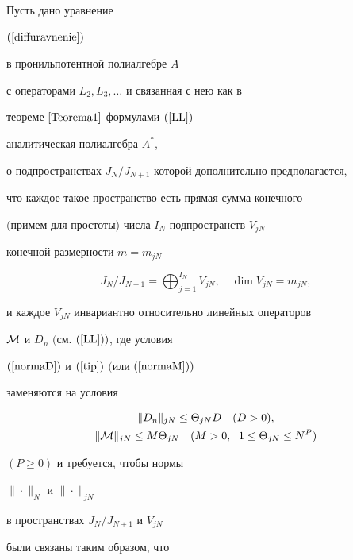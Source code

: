 \begin{thm}


\label{Teoremaegregium}


Пусть дано уравнение


$(\ref{diffuravnenie})$


в пронильпотентной полиалгебре $A$


с операторами $L_2, L_3, \dotsc$ и связанная с нею как в


теореме $\ref{Teorema1}$ формулами $(\ref{LL})$


аналитическая полиалгебра $A^*$,


о подпространствах $J_N/J_{N+1}$ которой дополнительно предполагается,


что каждое такое пространство есть прямая сумма конечного


$($примем для простоты$)$ числа $I_N$ подпространств $V_{jN}$


конечной размерности $m=m_{jN}$


$$




J_N/J_{N+1}=\bigoplus\nolimits_{j=1}^{I_N} V_{jN},\quad \dim V_{jN}=m_{jN},




$$


и каждое $V_{jN}$ инвариантно относительно линейных операторов


${\cal{M}}$ и $D_n$ $($см. $(\ref{LL}))$, где условия


$(\ref{normaD})$ и $(\ref{tip})$ $($или $(\ref{normaM}))$


заменяются на условия


\begin{gather*}


\|D_n\|_{jN}\leq \Theta_{jN} D \quad (D>0), \\


%


\|{\cal{M}}\|_{jN}\leq M\Theta_{jN}\quad


(M>0,\ \; 1\leq \Theta_{jN}\leq N^P )


\end{gather*}


$(P\geq0)$ и требуется, чтобы нормы


$\|\cdot\|_N$ и $\|\cdot\|_{jN}$


в пространствах $J_N/J_{N+1}$ и $V_{jN}$


были связаны таким образом, что



\end{thm}
